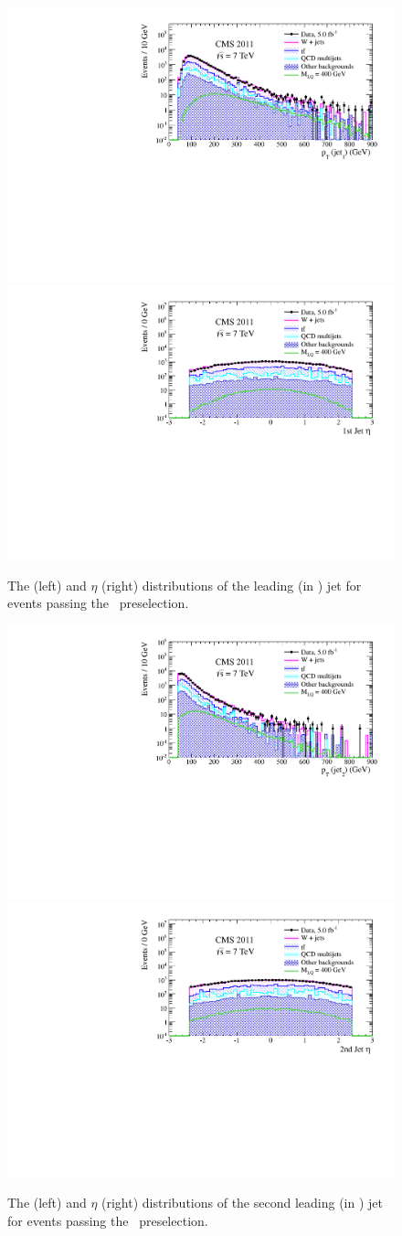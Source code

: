 \begin{figure}[htbp]
  \begin{center}
    {\includegraphics[width=.45\textwidth]{tex/analysis/event_selection/fig/enu/preselection/Pt1stJet_PAS_enujj_WZSherpa_noNSigma.pdf}}
    {\includegraphics[width=.45\textwidth]{tex/analysis/event_selection/fig/enu/preselection/Eta1stJet_PAS_enujj_WZSherpa_noNSigma.pdf}}
    \caption{
      The \pt (left) and $\eta$ (right) distributions of the leading
      (in \pt) jet for events passing the \enujj~preselection.
    }
    \label{fig:enujj_preselection_jet1}
  \end{center}
\end{figure}

\begin{figure}[htbp]
  \begin{center}
    {\includegraphics[width=.45\textwidth]{tex/analysis/event_selection/fig/enu/preselection/Pt2ndJet_PAS_enujj_WZSherpa_noNSigma.pdf}}
    {\includegraphics[width=.45\textwidth]{tex/analysis/event_selection/fig/enu/preselection/Eta2ndJet_PAS_enujj_WZSherpa_noNSigma.pdf}}
    \caption{
      The \pt (left) and $\eta$ (right) distributions of the second leading
      (in \pt) jet for events passing the \enujj~preselection.
    }
    \label{fig:enujj_preselection_jet2}
  \end{center}
\end{figure}

